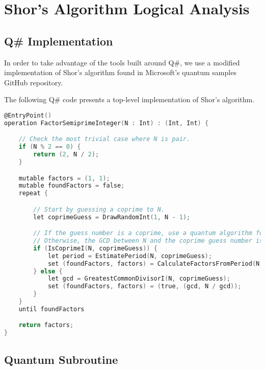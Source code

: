 %
%
\chapter {Shor's Algorithm Logical Analysis}

\section{Q\# Implementation}

In order to take advantage of the tools built around Q\#, we use a modified implementation of Shor's algorithm found in Microsoft's quantum samples GitHub repository.



The following Q\# code presents a top-level implementation of Shor's algorithm.

\begin{lstlisting}[language=C]
@EntryPoint()
operation FactorSemiprimeInteger(N : Int) : (Int, Int) {

    // Check the most trivial case where N is pair.
    if (N % 2 == 0) {
        return (2, N / 2);
    }

    mutable factors = (1, 1);
    mutable foundFactors = false;
    repeat {

        // Start by guessing a coprime to N.
        let coprimeGuess = DrawRandomInt(1, N - 1);

        // If the guess number is a coprime, use a quantum algorithm for period finding.
        // Otherwise, the GCD between N and the coprime guess number is one of the factors.
        if (IsCoprimeI(N, coprimeGuess)) {
            let period = EstimatePeriod(N, coprimeGuess);
            set (foundFactors, factors) = CalculateFactorsFromPeriod(N, coprimeGuess, period);
        } else {
            let gcd = GreatestCommonDivisorI(N, coprimeGuess);
            set (foundFactors, factors) = (true, (gcd, N / gcd));
        }
    }
    until foundFactors

    return factors;
}
\end{lstlisting}

\section{Quantum Subroutine}


